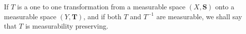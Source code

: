 If $T$ is a one to one transformation from a measurable space $(X, \mathbf{S})$ onto a measurable space $(Y, \mathbf{T})$, and if both $T$ and $T^{-1}$ are measurable, we shall say that $T$ is measurability preserving.
